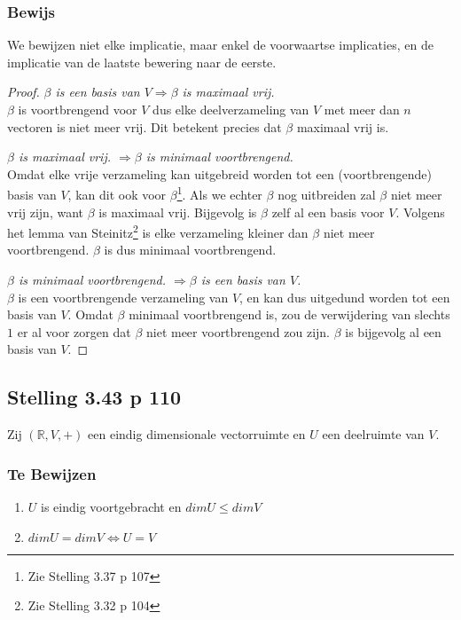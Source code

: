 \documentclass[lineaire_algebra_oplossingen.tex]{subfiles}
\begin{document}
\subsubsection*{Bewijs}
We bewijzen niet elke implicatie, maar enkel de voorwaartse implicaties, en de implicatie van de laatste bewering naar de eerste.
\begin{proof}
\item \emph{$\beta$ is een basis van $V \Rightarrow \beta$ is maximaal vrij.}\\
$\beta$ is voortbrengend voor $V$ dus elke deelverzameling van $V$ met meer dan $n$ vectoren is niet meer vrij. Dit betekent precies dat $\beta$ maximaal vrij is.
\item \emph{$\beta$ is maximaal vrij. $\Rightarrow \beta$ is minimaal voortbrengend.}\\
Omdat elke vrije verzameling kan uitgebreid worden tot een (voortbrengende) basis van $V$, kan dit ook voor $\beta$\footnote{Zie Stelling 3.37 p 107}. Als we echter $\beta$ nog uitbreiden zal $\beta$ niet meer vrij zijn, want $\beta$ is maximaal vrij. Bijgevolg is $\beta$ zelf al een basis voor $V$. Volgens het lemma van Steinitz\footnote{Zie Stelling 3.32 p 104} is elke verzameling kleiner dan $\beta$ niet meer voortbrengend. $\beta$ is dus minimaal voortbrengend.
\item \emph{$\beta$ is minimaal voortbrengend. $\Rightarrow \beta$ is een basis van $V$.}\\ $\beta$ is een voortbrengende verzameling van $V$, en kan dus uitgedund worden tot een basis van $V$. Omdat $\beta$ minimaal voortbrengend is, zou de verwijdering van slechts $1$ er al voor zorgen dat $\beta$ niet meer voortbrengend zou zijn. $\beta$ is bijgevolg al een basis van $V$.
\end{proof}


\subsection{Stelling 3.43 p 110}
\label{3.43}
Zij $(\mathbb{R},V,+)$ een eindig dimensionale vectorruimte en $U$ een deelruimte van $V$.

\subsubsection*{Te Bewijzen}
\begin{enumerate}
\item $U$ is eindig voortgebracht en $dimU \le dimV$
\item $dimU=dimV \Leftrightarrow U = V$
\end{enumerate}
\end{document}
